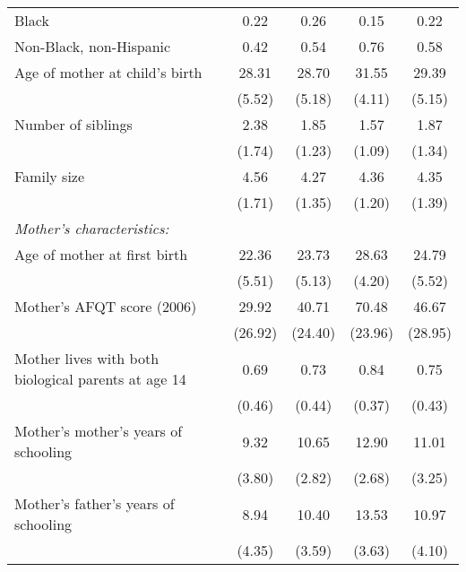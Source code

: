 \begin{table}[!t]
\begin{threeparttable}
\begin{tabular}{l*{4}{c}}
Black               &        0.22&        0.26&        0.15&        0.22\\

Non-Black, non-Hispanic&        0.42&        0.54&        0.76&        0.58\\

Age of mother at child's birth&       28.31&       28.70&       31.55&       29.39\\
                    &      (5.52)&      (5.18)&      (4.11)&      (5.15)\\

Number of siblings  &        2.38&        1.85&        1.57&        1.87\\
                    &      (1.74)&      (1.23)&      (1.09)&      (1.34)\\

Family size         &        4.56&        4.27&        4.36&        4.35\\
                    &      (1.71)&      (1.35)&      (1.20)&      (1.39)\\

\addlinespace
\textit{Mother's characteristics:} & & & & \\
\addlinespace
Age of mother at first birth&       22.36&       23.73&       28.63&       24.79\\
                    &      (5.51)&      (5.13)&      (4.20)&      (5.52)\\

Mother's AFQT score (2006)&       29.92&       40.71&       70.48&       46.67\\
                    &     (26.92)&     (24.40)&     (23.96)&     (28.95)\\

Mother lives with both biological parents at age 14&        0.69&        0.73&        0.84&        0.75\\
                    &      (0.46)&      (0.44)&      (0.37)&      (0.43)\\

Mother's mother's years of schooling&        9.32&       10.65&       12.90&       11.01\\
                    &      (3.80)&      (2.82)&      (2.68)&      (3.25)\\

Mother's father's years of schooling&        8.94&       10.40&       13.53&       10.97\\
                    &      (4.35)&      (3.59)&      (3.63)&      (4.10)\\


\end{tabular}
\end{threeparttable}
\end{table}
